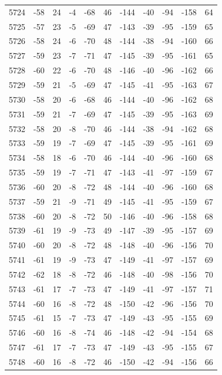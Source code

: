 \begin{table}[H]
\begin{tabular}{lllllllllll}
5724 & -58 & 24 & -4 & -68 & 46 & -144 & -40 & -94 & -158 & 64 \\
5725 & -57 & 23 & -5 & -69 & 47 & -143 & -39 & -95 & -159 & 65 \\
5726 & -58 & 24 & -6 & -70 & 48 & -144 & -38 & -94 & -160 & 66 \\
5727 & -59 & 23 & -7 & -71 & 47 & -145 & -39 & -95 & -161 & 65 \\
5728 & -60 & 22 & -6 & -70 & 48 & -146 & -40 & -96 & -162 & 66 \\
5729 & -59 & 21 & -5 & -69 & 47 & -145 & -41 & -95 & -163 & 67 \\
5730 & -58 & 20 & -6 & -68 & 46 & -144 & -40 & -96 & -162 & 68 \\
5731 & -59 & 21 & -7 & -69 & 47 & -145 & -39 & -95 & -163 & 69 \\
5732 & -58 & 20 & -8 & -70 & 46 & -144 & -38 & -94 & -162 & 68 \\
5733 & -59 & 19 & -7 & -69 & 47 & -145 & -39 & -95 & -161 & 69 \\
5734 & -58 & 18 & -6 & -70 & 46 & -144 & -40 & -96 & -160 & 68 \\
5735 & -59 & 19 & -7 & -71 & 47 & -143 & -41 & -97 & -159 & 67 \\
5736 & -60 & 20 & -8 & -72 & 48 & -144 & -40 & -96 & -160 & 68 \\
5737 & -59 & 21 & -9 & -71 & 49 & -145 & -41 & -95 & -159 & 67 \\
5738 & -60 & 20 & -8 & -72 & 50 & -146 & -40 & -96 & -158 & 68 \\
5739 & -61 & 19 & -9 & -73 & 49 & -147 & -39 & -95 & -157 & 69 \\
5740 & -60 & 20 & -8 & -72 & 48 & -148 & -40 & -96 & -156 & 70 \\
5741 & -61 & 19 & -9 & -73 & 47 & -149 & -41 & -97 & -157 & 69 \\
5742 & -62 & 18 & -8 & -72 & 46 & -148 & -40 & -98 & -156 & 70 \\
5743 & -61 & 17 & -7 & -73 & 47 & -149 & -41 & -97 & -157 & 71 \\
5744 & -60 & 16 & -8 & -72 & 48 & -150 & -42 & -96 & -156 & 70 \\
5745 & -61 & 15 & -7 & -73 & 47 & -149 & -43 & -95 & -155 & 69 \\
5746 & -60 & 16 & -8 & -74 & 46 & -148 & -42 & -94 & -154 & 68 \\
5747 & -61 & 17 & -7 & -73 & 47 & -149 & -43 & -95 & -155 & 67 \\
5748 & -60 & 16 & -8 & -72 & 46 & -150 & -42 & -94 & -156 & 66 \\

\end{tabular}
\end{table}
